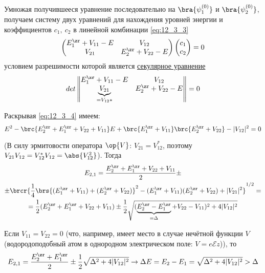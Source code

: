 Умножая получившееся уравнение последовательно на $\bra{\psi_1^{(0)}}$ и $\bra{\psi_2^{(0)}}$, получаем систему двух уравнений для нахождения уровней энергии и коэффициентов $c_1,~c_2$ в линейной комбинации \eqref{eq:12_3_3}
\begin{gather*}
  \begin{matrix}
    \begin{pmatrix}
      E_1^\zr + V_{11} - E & V_{12} \\
      V_{21} & E_2^\zr + V_{22} - E
    \end{pmatrix} 
    \begin{pmatrix}
      c_1\\
      c_2
    \end{pmatrix} 
     = 0
  \end{matrix}
\end{gather*}
условием разрешимости которой является \underline{секулярное уравнение}
\begin{equation}
\label{eq:12_3_4}
det \left \| \begin{matrix}
E_1^\zr + V_{11} - E & V_{12} \\ 
\underbrace{V_{21}}_{=V_{12}*} & E_2^\zr + V_{22} - E
\end{matrix}
\right \| = 0
\end{equation}

Раскрывая \eqref{eq:12_3_4} имеем:
$$
E^2 - \brc{E_2^\zr + E_1^\zr + V_{22} + V_{11}}E + \brc{E_1^\zr + V_{11}} \brc{E_2^\zr + V_{22}} - |V_{12}|^2 = 0
$$

(В силу эрмитовости оператора $\op{V}$: $V_{21} = V_{12}^*$, поэтому ${V_{21}V_{12} = V_{12}^* V_{12} = \abs{V_{12}^2}}$). Тогда
\begin{gather*}
E_{2, 1} = \frac{E_2^\zr + E_1^\zr + V_{22} + V_{11}}{2} \pm\\
\pm  \brcr{\frac{1}{4} \brs{ (E_1^\zr + V_{11}) + (E_2^\zr + V_{22}) }^2  - (E_1^\zr + V_{11})(E_2^\zr + V_{22}) + |V_{21}|^2 }^{1/2} = \\
= \frac{1}{2}(E_2^\zr + E_1^\zr + V_{22} + V_{11}) \pm \frac{1}{2} \sqrt{(\underbrace{E_2^\zr -E_1^\zr}_{=\Delta} + V_{22} - V_{11})^2 + 4 |V_{12}|^2}
\end{gather*}

Если $V_{11} = V_{22} = 0$ (что, например, имеет место в случае нечётной функции $V$ (водородоподобный атом в однородном электрическом поле: $V = e \mathcal{E} z$)), то 
$$
E_{2, 1}=\frac{E_2^\zr + E_1^\zr}{2} \pm \frac{1}{2} \sqrt{\Delta^2 + 4 |V_{12}|^2} \to \Delta E = E_2 - E_1 = \sqrt{\Delta^2 + 4 |V_{12}|^2} > \Delta
$$

